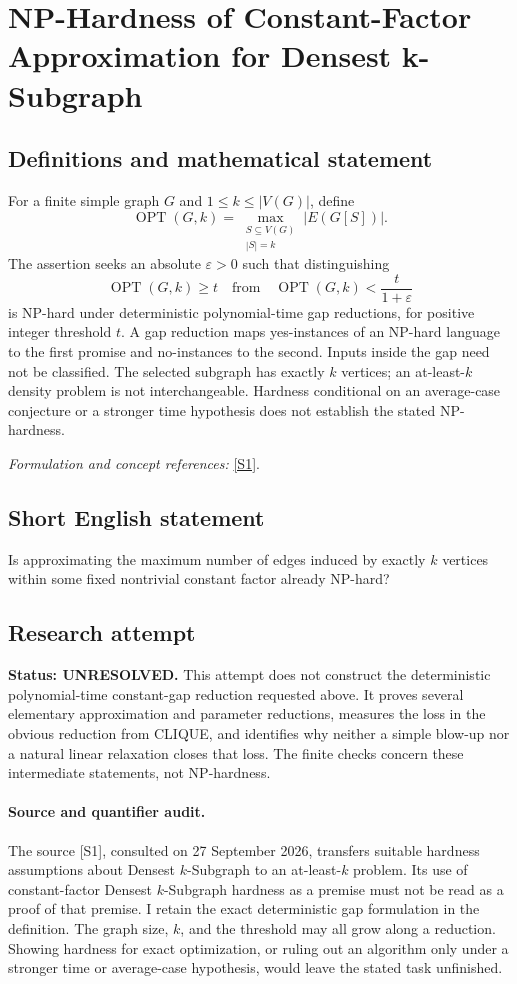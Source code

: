 \documentclass[11pt]{article}
\begin{document}
\section*{\texorpdfstring{NP-Hardness of Constant-Factor Approximation for Densest k-Subgraph}{NP-Hardness of Constant-Factor Approximation for Densest k-Subgraph}}\label{377}
\subsection{Definitions and mathematical statement}
For a finite simple graph $G$ and $1\le k\le|V(G)|$, define
\[
 \operatorname{OPT}(G,k)=\max_{\substack{S\subseteq V(G)\\|S|=k}}|E(G[S])|.
\]
The assertion seeks an absolute ${\varepsilon}>0$ such that distinguishing
\[
 \operatorname{OPT}(G,k)\ge t
 \quad\text{from}\quad
 \operatorname{OPT}(G,k)<\frac{t}{1+{\varepsilon}}
\]
is NP-hard under deterministic polynomial-time gap reductions, for positive integer threshold $t$. A gap reduction maps yes-instances of an NP-hard language to the first promise and no-instances to the second. Inputs inside the gap need not be classified. The selected subgraph has exactly $k$ vertices; an at-least-$k$ density problem is not interchangeable. Hardness conditional on an average-case conjecture or a stronger time hypothesis does not establish the stated NP-hardness.
\par\smallskip\textit{Formulation and concept references:} \href{https://arxiv.org/html/2605.25464v1}{[S1]}.

\subsection{Short English statement}
Is approximating the maximum number of edges induced by exactly $k$ vertices within some fixed nontrivial constant factor already NP-hard?
\subsection{Research attempt}
\textbf{Status: UNRESOLVED.} This attempt does not construct the deterministic polynomial-time constant-gap reduction requested above. It proves several elementary approximation and parameter reductions, measures the loss in the obvious reduction from CLIQUE, and identifies why neither a simple blow-up nor a natural linear relaxation closes that loss. The finite checks concern these intermediate statements, not NP-hardness.

\paragraph{Source and quantifier audit.}
The source [S1], consulted on 27 September 2026, transfers suitable hardness assumptions about Densest $k$-Subgraph to an at-least-$k$ problem. Its use of constant-factor Densest $k$-Subgraph hardness as a premise must not be read as a proof of that premise. I retain the exact deterministic gap formulation in the definition. The graph size, $k$, and the threshold may all grow along a reduction. Showing hardness for exact optimization, or ruling out an algorithm only under a stronger time or average-case hypothesis, would leave the stated task unfinished.
\end{document}
